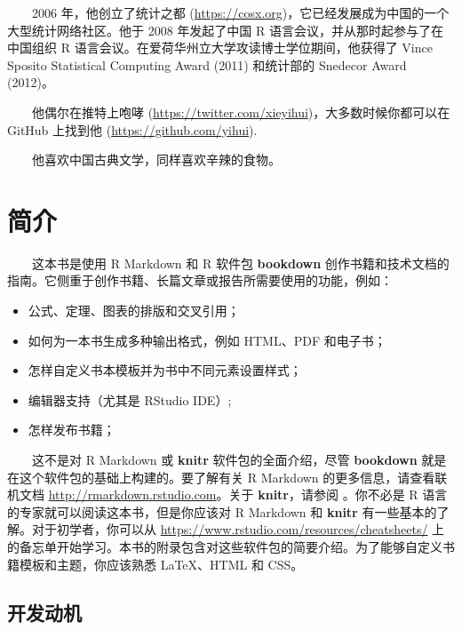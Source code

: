\documentclass[
  12pt,
]{krantz}
\providecommand{\tightlist}{%
  \setlength{\itemsep}{0pt}\setlength{\parskip}{0pt}}
\theoremstyle{definition}
\theoremstyle{definition}
\theoremstyle{definition}
\theoremstyle{definition}
\theoremstyle{remark}
\begin{document}
  2006 年，他创立了统计之都 (\url{https://cosx.org})，它已经发展成为中国的一个大型统计网络社区。他于 2008 年发起了中国 R 语言会议，并从那时起参与了在中国组织 R 语言会议。在爱荷华州立大学攻读博士学位期间，他获得了 Vince Sposito Statistical Computing Award (2011) 和统计部的 Snedecor Award (2012)。

  他偶尔在推特上咆哮 (\url{https://twitter.com/xieyihui})，大多数时候你都可以在 GitHub 上找到他 (\url{https://github.com/yihui}).

  他喜欢中国古典文学，同样喜欢辛辣的食物。

\mainmatter

\hypertarget{introduction}{%
\chapter{简介}\label{introduction}}

  这本书是使用 R Markdown \citep{R-rmarkdown} 和 R 软件包 \textbf{bookdown} \citep{R-bookdown} 创作书籍和技术文档的指南。它侧重于创作书籍、长篇文章或报告所需要使用的功能，例如：

\begin{itemize}
\tightlist
\item
  公式、定理、图表的排版和交叉引用；
\item
  如何为一本书生成多种输出格式，例如 HTML、PDF 和电子书；
\item
  怎样自定义书本模板并为书中不同元素设置样式；
\item
  编辑器支持（尤其是 RStudio IDE）;
\item
  怎样发布书籍；
\end{itemize}

  这不是对 R Markdown 或 \textbf{knitr} 软件包\citep{R-knitr}的全面介绍，尽管 \textbf{bookdown} 就是在这个软件包的基础上构建的。要了解有关 R Markdown 的更多信息，请查看联机文档 \url{http://rmarkdown.rstudio.com}。关于 \textbf{knitr}，请参阅 \citet{xie2015}。你不必是 R 语言\citep{R-base}的专家就可以阅读这本书，但是你应该对 R Markdown 和 \textbf{knitr} 有一些基本的了解。对于初学者，你可以从 \url{https://www.rstudio.com/resources/cheatsheets/} 上的备忘单开始学习。本书的附录包含对这些软件包的简要介绍。为了能够自定义书籍模板和主题，你应该熟悉 LaTeX、HTML 和 CSS。

\hypertarget{ux5f00ux53d1ux52a8ux673a}{%
\section{开发动机}\label{ux5f00ux53d1ux52a8ux673a}}
\end{document}
